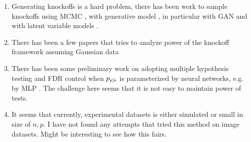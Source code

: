 \documentclass[11pt]{article}
\begin{document}
\begin{enumerate}
    \item Generating knockoffs is a hard problem, there has been work to sample knockoffs using MCMC \cite{batesMetropolizedKnockoffSampling2019}, with generative model \cite{romanoDeepKnockoffs2018}, in particular with GAN \cite{jordonKnockoffGANGeneratingKnockoffs2018} and with latent variable models \cite{gimenezKnockoffsMassNew2019}.
    \item There has been a few papers that tries to analyze power of the knockoff framework assuming Gaussian data \cite{liuPowerAnalysisKnockoff2020}
    \item There has been some preliminary work on adopting multiple hypothesis testing and FDR control when $p_{\mathsf{y}|\mathsf{x}}$ is parameterized by neural networks, e.g. by MLP \cite{luDeepPINKReproducibleFeature2018}. The challenge here seems that it is not easy to maintain power of tests.
    \item It seems that currently, experimental datasets is either simulated or small in size of $n,p$. I have not found any attempts that tried this method on image datasets. Might be interesting to see how this fairs.
\end{enumerate}



 
\newpage
\printbibliography 
\end{document}
